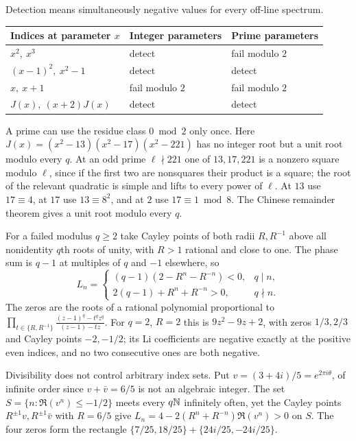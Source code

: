 \begin{example}\label{li:ex:schedules}
Detection means simultaneously negative values for every off-line spectrum.
\begin{center}\small
\begin{tabular}{@{}lll@{}}
\toprule
Indices at parameter $x$ & Integer parameters & Prime parameters\\
\midrule
$x^2,\ x^3$ & detect & fail modulo $2$\\
$(x-1)^2,\ x^2-1$ & detect & detect\\
$x,\ x+1$ & fail modulo $2$ & fail modulo $2$\\
$J(x),\ (x+2)J(x)$ & detect & detect\\
\bottomrule
\end{tabular}
\end{center}
A prime can use the residue class $0\bmod2$ only once. Here
$J(x)=(x^2-13)(x^2-17)(x^2-221)$ has no integer root but a unit root modulo every $q$. At an odd
prime $\ell\nmid221$ one of $13,17,221$ is a nonzero square modulo $\ell$, since if the first two
are nonsquares their product is a square; the root of the relevant quadratic is simple and lifts
to every power of $\ell$. At $13$ use $17\equiv4$, at $17$ use $13\equiv8^2$, and at $2$ use
$17\equiv1\bmod8$. The Chinese remainder theorem gives a unit root modulo every $q$.

For a failed modulus $q\ge2$ take Cayley points of both radii $R,R^{-1}$ above all nonidentity
$q$th roots of unity, with $R>1$ rational and close to one. The phase sum is $q-1$ at multiples of
$q$ and $-1$ elsewhere, so
\begin{equation}\label{li:eq:cyclo}
 L_n=\begin{cases}(q-1)(2-R^n-R^{-n})<0,&q\mid n,\\ 2(q-1)+R^n+R^{-n}>0,&q\nmid n.\end{cases}
\end{equation}
The zeros are the roots of a rational polynomial proportional to
$\prod_{t\in\{R,R^{-1}\}}\frac{(z-1)^q-t^qz^q}{(z-1)-tz}$. For $q=2$, $R=2$ this is $9z^2-9z+2$,
with zeros $1/3,2/3$ and Cayley points $-2,-1/2$; its Li coefficients are negative exactly at the
positive even indices, and no two consecutive ones are both negative.

Divisibility does not control arbitrary index sets. Put $v=(3+4i)/5=e^{2\pi i\theta}$, of
infinite order since $v+\bar v=6/5$ is not an algebraic integer. The set
$S=\{n:\Re(v^n)\le-1/2\}$ meets every $q\mathbb{N}$ infinitely often, yet the Cayley points
$R^{\pm1}v,R^{\pm1}\bar v$ with $R=6/5$ give $L_n=4-2(R^n+R^{-n})\Re(v^n)>0$ on $S$. The four
zeros form the rectangle $\{7/25,18/25\}+\{24i/25,-24i/25\}$.
\end{example}

